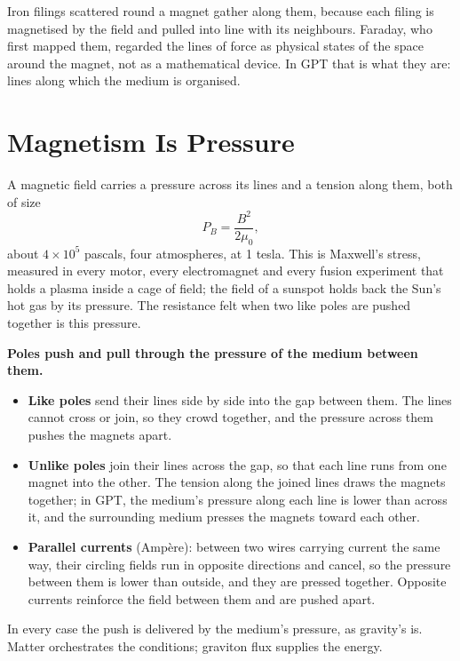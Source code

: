 \documentclass[11pt,a4paper]{article}
\begin{document}
 Iron filings scattered round a magnet gather along them, because each filing is magnetised by the field and pulled into line with its neighbours. Faraday, who first mapped them, regarded the lines of force as physical states of the space around the magnet, not as a mathematical device. In GPT that is what they are: lines along which the medium is organised.

\section{Magnetism Is Pressure}
\label{sec:pressure}

 A magnetic field carries a pressure across its lines and a tension along them, both of size
\begin{equation}
P_B = \frac{B^2}{2\mu_0},
\label{eq:pressure}
\end{equation}
about $4\times10^{5}$ pascals, four atmospheres, at 1 tesla. This is Maxwell's stress, measured in every motor, every electromagnet and every fusion experiment that holds a plasma inside a cage of field; the field of a sunspot holds back the Sun's hot gas by its pressure. The resistance felt when two like poles are pushed together is this pressure.

\begin{hypbar}
\textbf{Poles push and pull through the pressure of the medium between them.}
\begin{itemize}
\item \textbf{Like poles} send their lines side by side into the gap between them. The lines cannot cross or join, so they crowd together, and the pressure across them pushes the magnets apart.
\item \textbf{Unlike poles} join their lines across the gap, so that each line runs from one magnet into the other. The tension along the joined lines draws the magnets together; in GPT, the medium's pressure along each line is lower than across it, and the surrounding medium presses the magnets toward each other.
\item \textbf{Parallel currents} (Ampère): between two wires carrying current the same way, their circling fields run in opposite directions and cancel, so the pressure between them is lower than outside, and they are pressed together. Opposite currents reinforce the field between them and are pushed apart.
\end{itemize}
In every case the push is delivered by the medium's pressure, as gravity's is. Matter orchestrates the conditions; graviton flux supplies the energy.
\end{hypbar}
\end{document}
